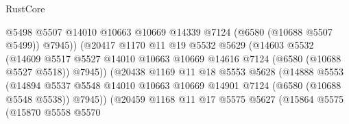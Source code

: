 \begin{lexlean}{RustCore}
\begin{coremodule}
                                      @5498
                                      @5507
                                      @14010
                                      @10663
                                      @10669
                                      @14339
                                      @7124
                                      (@6580 (@10688 @5507 @5499))
                                      @7945))
                                  (@20417
                                    @1170
                                    @11
                                    @19
                                    @5532
                                    @5629
                                    (@14603
                                      @5532
                                      (@14609
                                        @5517
                                        @5527
                                        @14010
                                        @10663
                                        @10669
                                        @14616
                                        @7124
                                        (@6580 (@10688 @5527 @5518))
                                        @7945))
                                    (@20438
                                      @1169
                                      @11
                                      @18
                                      @5553
                                      @5628
                                      (@14888
                                        @5553
                                        (@14894
                                          @5537
                                          @5548
                                          @14010
                                          @10663
                                          @10669
                                          @14901
                                          @7124
                                          (@6580 (@10688 @5548 @5538))
                                          @7945))
                                      (@20459
                                        @1168
                                        @11
                                        @17
                                        @5575
                                        @5627
                                        (@15864
                                          @5575
                                          (@15870
                                            @5558
                                            @5570

\end{coremodule}
\end{lexlean}
